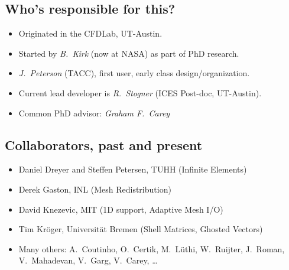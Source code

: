 
\subsection*{Who's responsible for this?}
\begin{frame}
  \begin{itemize}
    \itemsep=.5cm
  \item{Originated in the CFDLab, UT-Austin.}
  \item{Started by \emph{B.~Kirk} (now at NASA) as part of PhD research.}
  \item{\emph{J.~Peterson} (TACC), first user, early class design/organization.}
  \item{Current lead developer is \emph{R.~Stogner} (ICES Post-doc, UT-Austin).}
  \item{Common PhD advisor: \emph{Graham F.\ Carey}}
  \end{itemize}
\end{frame}


\subsection*{Collaborators, past and present}
\begin{frame}
      \begin{itemize}
        \itemsep=.25cm
      \item {Daniel Dreyer and Steffen Petersen, TUHH
          (Infinite Elements)
        }
      \item {Derek Gaston, INL
          (Mesh Redistribution)
        }
      \item {David Knezevic, MIT (1D support, Adaptive Mesh I/O) }
      \item {Tim Kr\"{o}ger, Universit\"{a}t Bremen 
          (Shell Matrices, Ghosted Vectors)
        }
      \item{Many others: A.~Coutinho, O.~Certik, M.~L\"{u}thi, W.~Ruijter, J.~Roman, V.~Mahadevan, V.~Garg, V.~Carey, \ldots }
      \end{itemize}
\end{frame}
